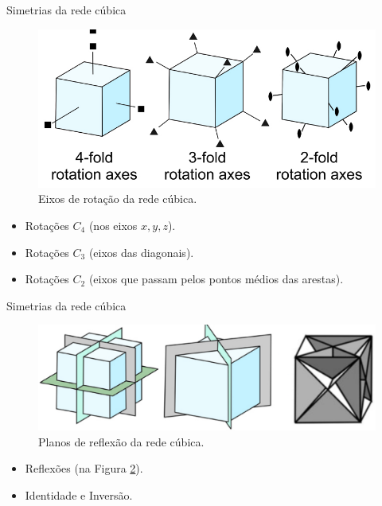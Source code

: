 \documentclass[aspectratio=169]{beamer}
\begin{document}
\begin{frame}{Simetrias da rede cúbica}

\begin{figure}[H]
\centering
\includegraphics[width=0.6\linewidth]{fig/rot_cubic.png}
\caption{Eixos de rotação da rede cúbica.}
\label{fig:rot_cubic}
\end{figure}


\begin{itemize}
\item Rotações $C_4$ (nos eixos $x, y, z$).
\item Rotações $C_3$ (eixos das diagonais).
\item Rotações $C_2$ (eixos que passam pelos pontos médios das arestas).
\end{itemize}

\end{frame}




\begin{frame}{Simetrias da rede cúbica}

\begin{figure}[H]
\centering
\includegraphics[width=0.6\linewidth]{fig/reflex_cubic.png}
\caption{Planos de reflexão da rede cúbica.}
\label{fig:reflex_cubic}
\end{figure}


\begin{itemize}
\item Reflexões (na Figura \ref{fig:reflex_cubic}).
\n
\item Identidade e Inversão.
\end{itemize}

\end{frame}


\end{document}
